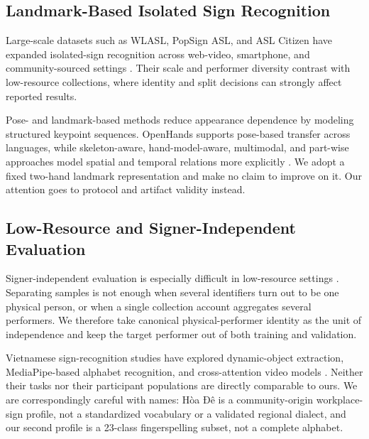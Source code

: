 \subsection{Landmark-Based Isolated Sign Recognition}

Large-scale datasets such as WLASL, PopSign ASL, and ASL Citizen have expanded isolated-sign recognition across web-video, smartphone, and community-sourced settings \cite{li_wlasl_2020,starner_popsign_2023,desai_asl_citizen_2023}. Their scale and performer diversity contrast with low-resource collections, where identity and split decisions can strongly affect reported results.

Pose- and landmark-based methods reduce appearance dependence by modeling structured keypoint sequences. OpenHands supports pose-based transfer across languages, while skeleton-aware, hand-model-aware, multimodal, and part-wise approaches model spatial and temporal relations more explicitly \cite{selvaraj_openhands_2022,jiang_samslr_2021,hu_signbert_2021,gruber_modalities_2021,lee_p3d_2023}. We adopt a fixed two-hand landmark representation and make no claim to improve on it. Our attention goes to protocol and artifact validity instead.

\subsection{Low-Resource and Signer-Independent Evaluation}

Signer-independent evaluation is especially difficult in low-resource settings \cite{sincan_chalearn_2021,holmes_low_resource_2022}. Separating samples is not enough when several identifiers turn out to be one physical person, or when a single collection account aggregates several performers. We therefore take canonical physical-performer identity as the unit of independence and keep the target performer out of both training and validation.

Vietnamese sign-recognition studies have explored dynamic-object extraction, MediaPipe-based alphabet recognition, and cross-attention video models \cite{pham_vsl_dynamic_2021,tran_vsl_alphabet_2025,chu_crossvivit_2025}. Neither their tasks nor their participant populations are directly comparable to ours. We are correspondingly careful with names: Hòa Đê is a community-origin workplace-sign profile, not a standardized vocabulary or a validated regional dialect, and our second profile is a 23-class fingerspelling subset, not a complete alphabet.

